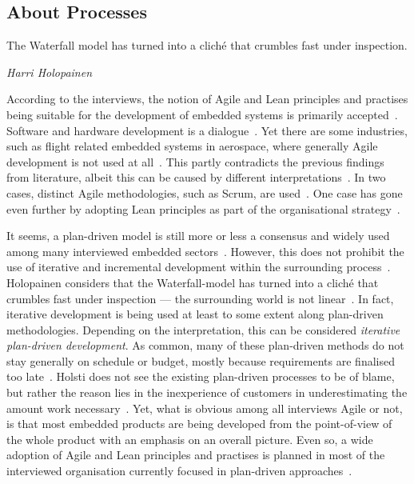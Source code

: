 \documentclass[english]{tktltiki2}
\begin{document}
\subsection{About Processes}

\epigraph{The Waterfall model has turned into a cliché that crumbles fast under inspection.}{\textit{Harri Holopainen~\cite{Hol15a}}}

According to the interviews, the notion of Agile and Lean principles and practises being suitable for the development of embedded systems is primarily accepted~\cite{BT15, Hol15a, Koi15, Kri15, Pet15}. Software and hardware development is a dialogue~\cite{BT15}. Yet there are some industries, such as flight related embedded systems in aerospace, where generally Agile development is not used at all~\cite{Hol15b}. This partly contradicts the previous findings from literature, albeit this can be caused by different interpretations~\cite{LB03}. In two cases, distinct Agile methodologies, such as Scrum, are used~\cite{BT15, Pet15}. One case has gone even further by adopting Lean principles as part of the organisational strategy~\cite{BT15}.

It seems, a plan-driven model is still more or less a consensus and widely used among many interviewed embedded sectors~\cite{Hol15b, Koi15}. However, this does not prohibit the use of iterative and incremental development within the surrounding process~\cite{Hol15b}. Holopainen considers that the Waterfall-model has turned into a cliché that crumbles fast under inspection — the surrounding world is not linear~\cite{Hol15a}. In fact, iterative development is being used at least to some extent along plan-driven methodologies. Depending on the interpretation, this can be considered \emph{iterative plan-driven development}. As common, many of these plan-driven methods do not stay generally on schedule or budget, mostly because requirements are finalised too late~\cite{Hol15b}. Holsti does not see the existing plan-driven processes to be of blame, but rather the reason lies in the inexperience of customers in underestimating the amount work necessary~\cite{Hol15b}. Yet, what is obvious among all interviews Agile or not, is that most embedded products are being developed from the point-of-view of the whole product with an emphasis on an overall picture. Even so, a wide adoption of Agile and Lean principles and practises is planned in most of the interviewed organisation currently focused in plan-driven approaches~\cite{Koi15}.
\end{document}
